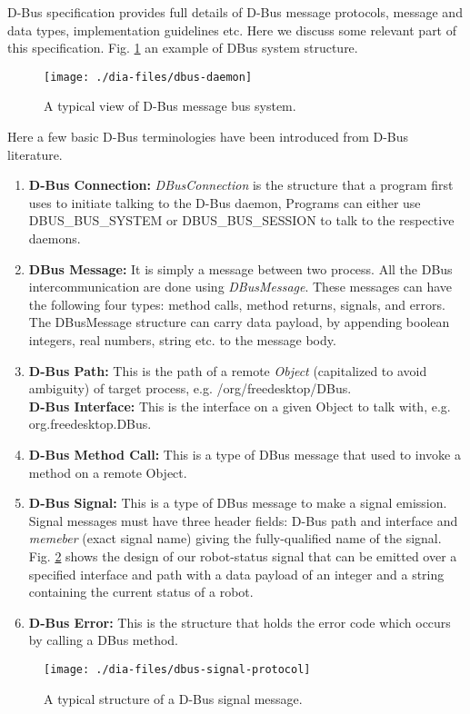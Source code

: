 D-Bus specification \cite{Pennington+2010} provides full details of D-Bus message protocols, message and data types, implementation guidelines etc. Here we discuss some relevant part of this specification. Fig. \ref{fig:dbus-daemon} an example of DBus system structure.
%
\begin{figure}
\begin{center}
\texttt{[image: ./dia-files/dbus-daemon]} 
\caption{A typical view of D-Bus message bus system. } 
\label{fig:dbus-daemon}
\end{center}
\end{figure}
%
Here a few basic D-Bus terminologies have been introduced from D-Bus literature.
\begin{enumerate}
\item \textbf{D-Bus Connection: }
\textit{DBusConnection} is the structure that a program first uses to initiate talking to the D-Bus daemon, Programs can either use\\ DBUS\_BUS\_SYSTEM or DBUS\_BUS\_SESSION to talk to the respective daemons.
\item \textbf{DBus Message: }
It is simply a message between two process. All the DBus intercommunication are done using \textit{DBusMessage}. These messages can have the following four types: method calls, method returns, signals, and errors. The DBusMessage structure can carry data payload, by appending boolean integers, real numbers, string etc. to the message body.
\item \textbf{D-Bus Path: }
This is the path of a remote \textit{Object} (capitalized to avoid ambiguity) of target process, e.g. /org/freedesktop/DBus.\\
\textbf{D-Bus Interface: }
This is the interface on a given Object to talk with, e.g. org.freedesktop.DBus.
%
\item \textbf{D-Bus Method Call: }
This is a type of DBus message that used to invoke a method on a remote Object.
%
\item \textbf{D-Bus Signal: }
This is a type of DBus message to make a signal emission. Signal messages must have three header fields: D-Bus path and interface and {\em memeber} (exact signal name) giving the fully-qualified name of the signal. Fig. \ref{fig:dbus-signal-protocol}  shows the design of our robot-status signal that can be emitted over a specified interface and path with a data payload of an integer and a string containing the current status of a robot.
%
\item \textbf{D-Bus Error: }
This is the structure that holds the error code which occurs by calling a DBus method.
\end{enumerate}
\begin{figure}
\begin{center}
\texttt{[image: ./dia-files/dbus-signal-protocol]} 
\caption{A typical structure of a D-Bus signal message.} 
\label{fig:dbus-signal-protocol}
\end{center}
\end{figure}
